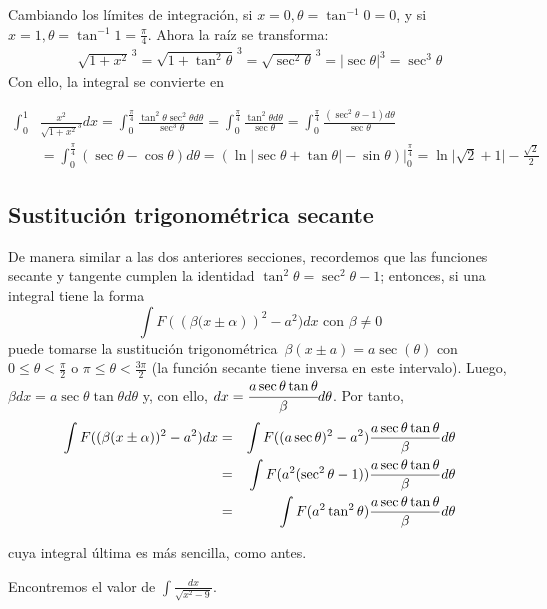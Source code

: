 Cambiando los límites de integración, si $x=0, \theta =\tan^{-1} 0 =0 $, y si $x=1, \theta =\tan^{-1} 1 =\frac{\pi}{4} $. Ahora la raíz se transforma:
{\small
\begin{align*}
\sqrt{1+x^{2}}^{\,3}
=\sqrt{1+\tan ^{2}\theta}^{\,3}
=\sqrt{\sec ^{2}\theta }^{\,3}=|\sec\theta|^{3}
=\sec^{3} \theta
\end{align*}
}
Con ello, la integral se convierte en

{\small
\begin{align*}
\int_{0}^{1}&\frac{x^{2}}{\sqrt{1+x^{2}}^{3}}dx=\int_{0}^{\frac{\pi}{4}}\frac{\tan^{2}\theta\sec^{2}\theta d\theta}{\sec^{3}\theta}
=\int_{0}^{\frac{\pi}{4}}\frac{\tan^{2}\theta d\theta}{\sec\theta}
=\int_{0}^{\frac{\pi}{4}}\frac{(\sec^{2}\theta-1) d\theta}{\sec\theta}\\
&=\int_{0}^{\frac{\pi}{4}}(\sec\theta-\cos\theta) d\theta
=\left( \ln\vert\sec\theta+\tan\theta\vert-\sin\theta \right)\big|_{0}^{\frac{\pi}{4}}= \ln\vert\sqrt{2}+1\vert-\frac{\sqrt{2}}{2}
\end{align*}
}

\subsection*{Sustitución trigonométrica secante}
De manera similar a las dos anteriores secciones, recordemos que las funciones secante y tangente cumplen la identidad $\tan^2\theta=\sec^2\theta-1$; entonces, si una integral tiene la forma
{\small
\[
\int F(\left( \beta (x\pm \alpha \right) )^{2}-a^{2})dx\text{ con } \beta\neq 0
\]
}
puede tomarse la sustitución trigonométrica\ $\beta (x\pm a)=a\sec(\theta )$ con $0\leq \theta <\frac{\pi }{2}$ o $\pi \leq \theta <\frac{3\pi}{2}$ (la función secante tiene inversa en este intervalo). Luego, $\beta dx=a\sec \theta \tan \theta d\theta$ y, con ello, $dx=\cfrac{a\sec \theta\tan \theta }{\beta }d\theta $. Por tanto,
{\small
\begin{eqnarray*}
\int F(\left( \beta (x\pm \alpha \right) )^{2}-a^{2})dx &=&\int F((a\sec\theta)^{2}-a^{2})\frac{a\sec \theta\tan \theta}{\beta }d\theta
\\
&=&\int F(a^{2}(\sec ^{2}\theta-1))\frac{a\sec \theta\tan\theta}{%
\beta }d\theta \\
&=&\int F(a^{2}\tan ^{2}\theta )\frac{a\sec \theta\tan\theta}{%
\beta }d\theta
\end{eqnarray*}
}

cuya integral última es más sencilla, como antes.

\begin{ejemplo} \textnormal{Encontremos el valor de} $\displaystyle{\int\frac{dx}{\sqrt{x^{2}-9}}}$.
\end{ejemplo}

